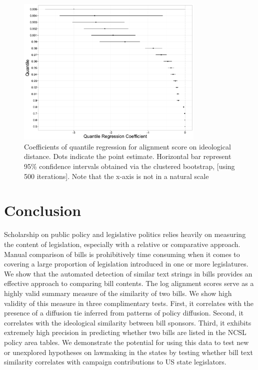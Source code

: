 \documentclass[12pt]{article} %
\begin{document}
\begin{figure}[ht!]
    \centering
    \includegraphics[width=0.8\textwidth]{figures/quantile_regression.png}
    \caption{Coefficients of quantile regression for alignment score on
    ideological distance. Dots indicate the point estimate. Horizontal bar
represent 95\% confidence intervals obtained via the clustered bootstrap, [using
500 iterations]. Note that the x-axis is not in a natural scale}
    \label{fig:quantile_regression}
\end{figure}


\clearpage


\section{Conclusion}
Scholarship on public policy and legislative politics relies heavily on measuring the content of legislation, especially with a relative or comparative approach. Manual comparison of bills is prohibitively time consuming when it comes to covering a large proportion of legislation introduced in one or more legislatures. We show that the automated detection of similar text strings in bills provides an effective approach to comparing bill contents. The log alignment scores serve as a highly valid summary measure of the similarity of two bills. We show high validity of this measure in three complimentary tests. First, it correlates with the presence of a diffusion tie inferred from patterns of policy diffusion. Second, it correlates with the ideological similarity between bill sponsors. Third, it exhibits extremely high precision in predicting whether two bills are listed in the NCSL policy area tables. We demonstrate the potential for using this data to test new or unexplored hypotheses on lawmaking in the states by testing whether bill text similarity correlates with campaign contributions to US state legislators.
\end{document}
